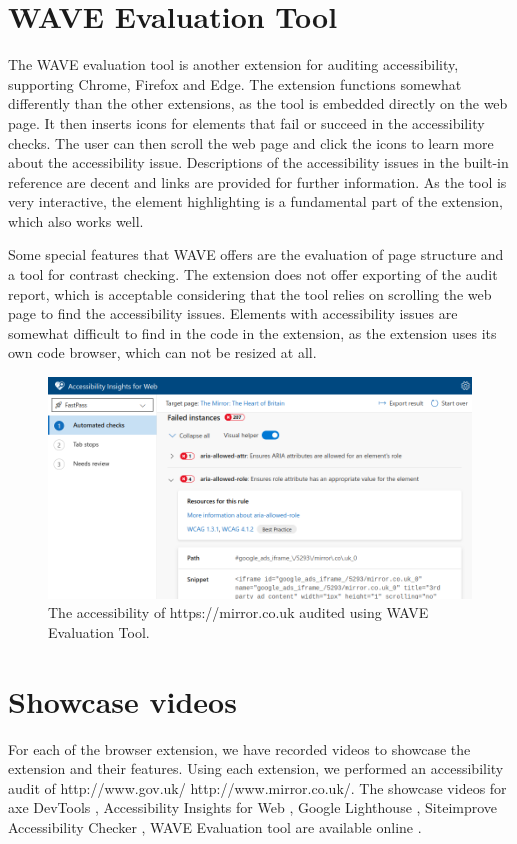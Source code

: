 \section{WAVE Evaluation Tool}
The WAVE evaluation tool \parencite{wave} is another extension for auditing accessibility, supporting Chrome, Firefox and Edge.
The extension functions somewhat differently than the other extensions, as the tool is embedded directly on the web page.
It then inserts icons for elements that fail or succeed in the accessibility checks.
The user can then scroll the web page and click the icons to learn more about the accessibility issue.
Descriptions of the accessibility issues in the built-in reference are decent and links are provided for further information.
As the tool is very interactive, the element highlighting is a fundamental part of the extension, which also works well.

Some special features that WAVE offers are the evaluation of page structure and a tool for contrast checking.
The extension does not offer exporting of the audit report, which is acceptable considering that the tool relies on scrolling the web page to find the accessibility issues.
Elements with accessibility issues are somewhat difficult to find in the code in the extension, as the extension uses its own code browser, which can not be resized at all.

\begin{figure}[h]
\centering
\includegraphics[keepaspectratio,width=\linewidth,height=\halfh]
{images/insights-ext.png}

\caption[WAVE Evaluation Tool]{
The accessibility of https://mirror.co.uk audited using WAVE Evaluation Tool.
}
\label{fig:wave-ext}
\end{figure}


\section{Showcase videos}
For each of the browser extension, we have recorded videos to showcase the extension and their features.
Using each extension, we performed an accessibility audit of http://www.gov.uk/ http://www.mirror.co.uk/.
The showcase videos for axe DevTools \parencite{axe_ext_vid}, Accessibility Insights for Web \parencite{aiweb_ext_vid}, Google Lighthouse \parencite{lighthouse_ext_vid}, Siteimprove Accessibility Checker \parencite{siteimprove_ext_vid}, WAVE Evaluation tool are available online \parencite{wave_ext_vid}.

